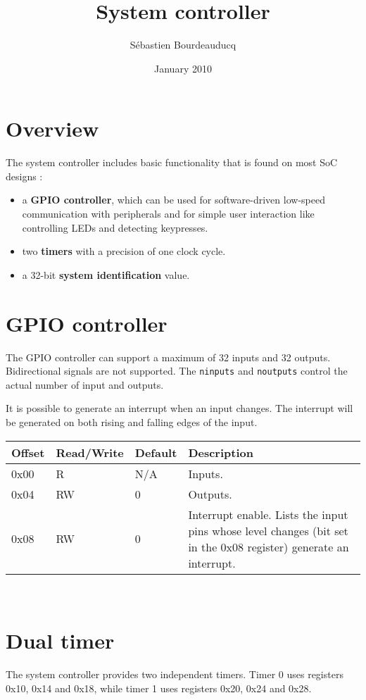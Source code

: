 \documentclass[a4paper,11pt]{article}
\title{System controller}
\author{S\'ebastien Bourdeauducq}
\date{January 2010}
\begin{document}
\setlength{\parindent}{0pt}
\setlength{\parskip}{5pt}
\maketitle{}
\section{Overview}

The system controller includes basic functionality that is found on most SoC designs :
\begin{itemize}
\item a \textbf{GPIO controller}, which can be used for software-driven low-speed communication with peripherals and for simple user interaction like controlling LEDs and detecting keypresses.
\item two \textbf{timers} with a precision of one clock cycle.
\item a 32-bit \textbf{system identification} value.
\end{itemize}

\section{GPIO controller}

The GPIO controller can support a maximum of 32 inputs and 32 outputs. Bidirectional signals are not supported. The \verb!ninputs! and \verb!noutputs! control the actual number of input and outputs.

It is possible to generate an interrupt when an input changes. The interrupt will be generated on both rising and falling edges of the input.

\begin{tabularx}{\textwidth}{|l|l|l|X|}
\hline
\bf{Offset} & \bf{Read/Write} & \bf{Default} & \bf{Description} \\
\hline
0x00 & R & N/A & Inputs. \\
\hline
0x04 & RW & 0 & Outputs. \\
\hline
0x08 & RW & 0 & Interrupt enable. Lists the input pins whose level changes (bit set in the 0x08 register) generate an interrupt. \\
\hline
\end{tabularx}\\

\section{Dual timer}
The system controller provides two independent timers. Timer 0 uses registers 0x10, 0x14 and 0x18, while timer 1 uses registers 0x20, 0x24 and 0x28.
\end{document}
